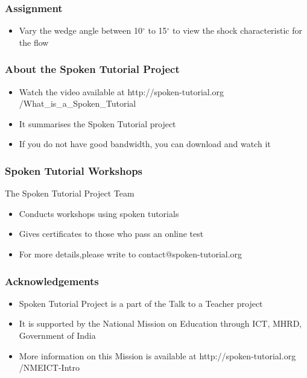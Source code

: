 \documentclass[17pt]{beamer}
\begin{document}
	\begin{frame}[<+-|alert@+>]
	
		\transdissolve \frametitle{Assignment}
			
		
			\begin{itemize}
	\item{Vary the wedge angle between 10$^\circ$ to 15$^\circ$  to view the shock characteristic for the flow}
	\end{itemize}
	\end{frame}
	

	
	
\begin{frame}
\frametitle{About the Spoken Tutorial Project}
\begin{itemize}
\item Watch the video available at {\color{blue} http://spoken-tutorial.org /What\_is\_a\_Spoken\_Tutorial} 
\item It summarises the Spoken Tutorial project 
\item If you do not have good bandwidth, you can download \newline and watch it
\end{itemize}
\end{frame}


\begin{frame}
\frametitle{Spoken Tutorial Workshops}
The Spoken Tutorial Project Team
\begin{itemize}
\item Conducts workshops using spoken tutorials
\item Gives certificates to those who pass an online test
\item For more details,please write to {\color{blue}contact@spoken-tutorial.org}
\end{itemize}
\end{frame}


\begin{frame}
\frametitle{Acknowledgements}
\begin{itemize}
\item Spoken Tutorial Project is a part of the Talk to a Teacher
  project
\item It is supported by the National Mission on Education through
  ICT, MHRD, Government of India
\item More information on this Mission is available at
{\color{blue} http://spoken-tutorial.org /NMEICT-Intro}
\end{itemize}
\end{frame}
	
\end{document}
